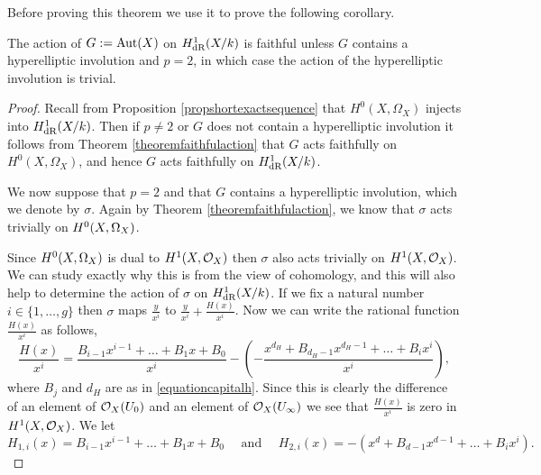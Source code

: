 Before proving this theorem we use it to prove the following corollary.

    \begin{cor}\label{corfaithfulactiononderhamhone}
    The action of $G := \operatorname{Aut}(X)$ on $H_{\text {dR}}^1(X/k)$ is faithful unless $G$ contains a hyperelliptic involution and $p=2$, in which case the action of the hyperelliptic involution is trivial.
    \end{cor}

    \begin{proof}
    Recall from Proposition \ref{propshortexactsequence} that $H^0(X,\Omega_X)$ injects into $H_{\text {dR}}^1(X/k)$.
    Then if $p \neq 2$ or $G$ does not contain a hyperelliptic involution it follows from Theorem \ref{theoremfaithfulaction} that $G$ acts faithfully on $H^0(X,\Omega_X)$, and hence $G$ acts faithfully on $H_{\text {dR}}^1(X/k)$.
    
    We now suppose that $p=2$ and that $G$ contains a hyperelliptic involution, which we denote by $\sigma$.
    Again by Theorem \ref{theoremfaithfulaction}, we know that $\sigma$ acts trivially on ${H^0(X,\Omega_X)}$.
    
    Since ${H^0(X,\Omega_X)}$ is dual to $H^1(X,\mathcal{O}_X)$ then $\sigma$ also acts trivially on $H^1(X,\mathcal{O}_X)$.
    We can study exactly why this is from the view of \cech cohomology, and this will also help to determine the action of $\sigma$ on $H_{\text {dR}}^1(X/k)$.
    If we fix a natural number $i\in \{1, \ldots ,g\}$ then $\sigma$ maps $\frac{y}{x^i}$ to $\frac{y}{x^i} + \frac{H(x)}{x^i}$. 
    Now we can write the rational function $\frac{H(x)}{x^i}$ as follows, 
        \begin{equation*}
        \frac{H(x)}{x^i} =  \frac{B_{i-1}x^{i-1} + \ldots + B_1x + B_0}{x^i} - \left( - \frac{x^{d_H} + B_{d_H-1}x^{d_H-1} + \ldots + B_ix^i}{x^i} \right),
        \end{equation*}
    where $B_j$ and $d_H$ are as in \eqref{equationcapitalh}.
    Since this is clearly the difference of an element of ${\cal O}_X(U_0)$ and an element of ${\cal O}_X(U_\infty)$ we see that $\frac{H(x)}{x^i}$ is zero in $H^1(X,\mathcal{O}_X)$.
    We let 
        \[
        H_{1,i}(x) = B_{i-1}x^{i-1} + \ldots + B_1x + B_0 \quad \text{ and } \quad H_{2,i}(x) = -( x^d + B_{d-1}x^{d-1} + \ldots + B_ix^i).
        \]
    

\end{proof}
